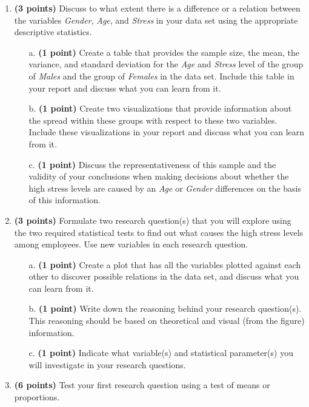 {\begin{enumerate}
    \item \textbf{(3 points)} Discuss to what extent there is a difference or a relation between the variables \textit{Gender}, \textit{Age}, and \textit{Stress} in your data set using the appropriate descriptive statistics. 
    \begin{itemize}
        \item[a.] \textbf{(1 point)} Create a table that provides the sample size, the mean, the variance, and standard deviation for the \textit{Age} and \textit{Stress} level of the group of \textit{Males} and the group of \textit{Females} in the data set. Include this table in your report and discuss what you can learn from it. 
        \item[b.] \textbf{(1 point)} Create two visualizations that provide information about the spread within these groups with respect to these two variables. Include these visualizations in your report and discuss what you can learn from it.  
        \item[c.] \textbf{(1 point)} Discuss the representativeness of this sample and the validity of your conclusions when making decisions about whether the high stress levels are caused by an \textit{Age} or \textit{Gender} differences on the basis of this information.
    \end{itemize}
    \item \textbf{(3 points)} Formulate two research question(s) that you will explore using the two required statistical tests to find out what causes the high stress levels among employees. Use new variables in each research question.
    \begin{itemize}
        \item[a.] \textbf{(1 point)} Create a plot that has all the variables plotted against each other to discover possible relations in the data set, and discuss what you can learn from it.
        \item[b.] \textbf{(1 point)} Write down the reasoning behind your research question(s). This reasoning should be based on theoretical and visual (from the figure) information.
        \item[c.] \textbf{(1 point)} Indicate what variable(s) and statistical parameter(s) you will investigate in your research questions.
    \end{itemize}
    \item \textbf{(6 points)} Test your first research question using a test of means or proportions.
    \begin{itemize}

\end{itemize}
\end{enumerate}}
